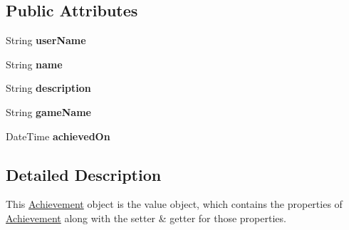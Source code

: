 \subsection*{Public Attributes}
\begin{DoxyCompactItemize}
\item 
\hypertarget{classcom_1_1shephertz_1_1app42_1_1paas_1_1sdk_1_1csharp_1_1achievement_1_1_achievement_a1d7f99638afca514494249afc81bc46c}{String {\bfseries user\+Name}}\label{classcom_1_1shephertz_1_1app42_1_1paas_1_1sdk_1_1csharp_1_1achievement_1_1_achievement_a1d7f99638afca514494249afc81bc46c}

\item 
\hypertarget{classcom_1_1shephertz_1_1app42_1_1paas_1_1sdk_1_1csharp_1_1achievement_1_1_achievement_a3f85d100766e552def8248398e7c6b6b}{String {\bfseries name}}\label{classcom_1_1shephertz_1_1app42_1_1paas_1_1sdk_1_1csharp_1_1achievement_1_1_achievement_a3f85d100766e552def8248398e7c6b6b}

\item 
\hypertarget{classcom_1_1shephertz_1_1app42_1_1paas_1_1sdk_1_1csharp_1_1achievement_1_1_achievement_af7b2d09ea104d2789128224250d24e98}{String {\bfseries description}}\label{classcom_1_1shephertz_1_1app42_1_1paas_1_1sdk_1_1csharp_1_1achievement_1_1_achievement_af7b2d09ea104d2789128224250d24e98}

\item 
\hypertarget{classcom_1_1shephertz_1_1app42_1_1paas_1_1sdk_1_1csharp_1_1achievement_1_1_achievement_a640f977d65255ef7e0f69823a3b1bf04}{String {\bfseries game\+Name}}\label{classcom_1_1shephertz_1_1app42_1_1paas_1_1sdk_1_1csharp_1_1achievement_1_1_achievement_a640f977d65255ef7e0f69823a3b1bf04}

\item 
\hypertarget{classcom_1_1shephertz_1_1app42_1_1paas_1_1sdk_1_1csharp_1_1achievement_1_1_achievement_a5f62ee129e2a8c3be18fc3c2a062ac68}{Date\+Time {\bfseries achieved\+On}}\label{classcom_1_1shephertz_1_1app42_1_1paas_1_1sdk_1_1csharp_1_1achievement_1_1_achievement_a5f62ee129e2a8c3be18fc3c2a062ac68}

\end{DoxyCompactItemize}


\subsection{Detailed Description}
This \hyperlink{classcom_1_1shephertz_1_1app42_1_1paas_1_1sdk_1_1csharp_1_1achievement_1_1_achievement}{Achievement} object is the value object, which contains the properties of \hyperlink{classcom_1_1shephertz_1_1app42_1_1paas_1_1sdk_1_1csharp_1_1achievement_1_1_achievement}{Achievement} along with the setter \& getter for those properties. 



